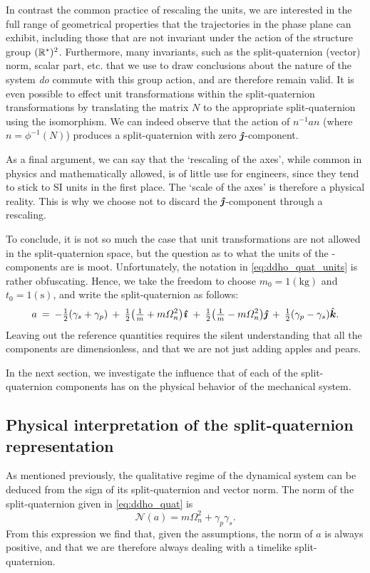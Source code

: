 In contrast the common practice of rescaling the units, we are interested in the full range of geometrical properties that the trajectories in the phase plane can exhibit, including those that are not invariant under the action of the structure group \((\mathbb{R}^*)^2\). Furthermore, many invariants, such as the split-quaternion (vector) norm, scalar part, etc. that we use to draw conclusions about the nature of the system \emph{do} commute with this group action, and are therefore remain valid. It is even possible to effect unit transformations within the split-quaternion transformations by translating the matrix \(N\) to the appropriate split-quaternion using the isomorphism. We can indeed observe that the action of \(n^{-1} a n\) (where \(n = \phi^{-1}(N)\)) produces a split-quaternion with zero \(\quatj\)-component. 

As a final argument, we can say that the `rescaling of the axes', while common in physics and mathematically allowed, is of little use for engineers, since they tend to stick to SI units in the first place. The `scale of the axes' is therefore a physical reality. This is why we choose not to discard the \(\quatj\)-component through a rescaling.

To conclude, it is not so much the case that unit transformations are not allowed in the split-quaternion space, but the question as to what the units of the \quatj-components are is moot. Unfortunately, the notation in \cref{eq:ddho_quat_units} is rather obfuscating. Hence, we take the freedom to choose \(m_0 = 1 (\si{\kilogram})\) and \(t_0 = 1 (\si{\second})\), and write the split-quaternion as follows:
\begin{equation}
    a\:=\: -\tfrac{1}{2}\qty(\gamma_s + \gamma_p)\:+\:\tfrac{1}{2}\qty(\tfrac{1}{m} + m\Omega_n^2)\quati\:+\:\tfrac{1}{2}\qty(\tfrac{1}{m} - m\Omega_n^2)\quatj\:+\:\tfrac{1}{2}\qty(\gamma_p - \gamma_s)\quatk. 
    \label{eq:ddho_quat}
\end{equation}
Leaving out the reference quantities requires the silent understanding that all the components are dimensionless, and that we are not just adding apples and pears. 

In the next section, we investigate the influence that of each of the split-quaternion components has on the physical behavior of the mechanical system.

\subsection{Physical interpretation of the split-quaternion representation}
As mentioned previously, the qualitative regime of the dynamical system can be deduced from the sign of its split-quaternion and vector norm.  The norm of the split-quaternion given in \cref{eq:ddho_quat} is
\begin{equation}
     \mathscr{N}(a) = m \Omega_n^2 + \gamma_p \gamma_s.
\end{equation}
From this expression we find that, given the assumptions, the norm of \(a\) is always positive, and that we are therefore always dealing with a timelike split-quaternion. 

